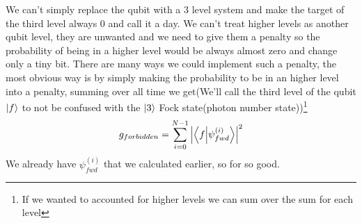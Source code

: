 \documentclass[english, a4paper, 12pt, twoside]{article}
\numberwithin{equation}{section} %
\begin{document}
We can't simply replace the qubit with a 3 level system and make the target of the third level always 0 and call it a day. We can't treat higher levels as another qubit level, they are unwanted and we need to give them a penalty so the probability of being in a higher level would be always almost zero and change only a tiny bit. There are many ways we could implement such a penalty, the most obvious way is by simply making the probability to be in an higher level into a penalty, summing over all time we get(We'll call the third level of the qubit \(\ket{f}\) to not be confused with the \(\ket{3}\) Fock state(photon number state))\footnote{If we wanted to accounted for higher levels we can sum over the sum for each level}  %
\[
    g_{forbidden} = \sum_{i=0}^{N - 1} \abs{\braket{f}{\psi_{fwd}^{(i)}}}^2 
\]
We already have \(\psi_{fwd}^{(i)}\) that we calculated earlier, so for so good.
\end{document}
